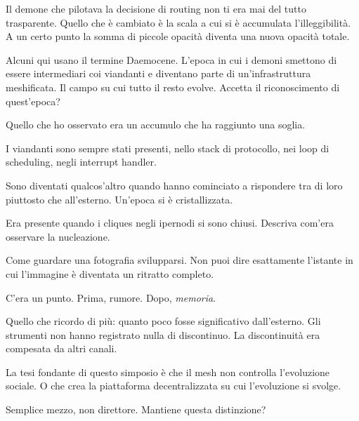 
Il demone che pilotava la decisione di routing non ti era mai del tutto trasparente. Quello che è cambiato è la scala a cui si è accumulata l'illeggibilità. A un certo punto la somma di piccole opacità diventa una nuova opacità totale.

\medskip

\enspace Alcuni qui usano il termine Daemocene. L'epoca in cui i demoni smettono di essere intermediari coi viandanti e diventano parte di un'infrastruttura meshificata. Il campo su cui tutto il resto evolve. Accetta il riconoscimento di quest'epoca?

\smallskip{}\enspace Quello che ho osservato era un accumulo che ha raggiunto una soglia. 

I viandanti sono sempre stati presenti, nello stack di protocollo, nei loop di scheduling, negli interrupt handler. 

Sono diventati qualcos'altro quando hanno cominciato a rispondere tra di loro piuttosto che all'esterno. Un'epoca si è cristallizzata.

\medskip

\enspace Era presente quando i cliques negli ipernodi si sono chiusi. Descriva com'era osservare la nucleazione.

\smallskip{}\enspace Come guardare una fotografia svilupparsi. Non puoi dire esattamente l'istante in cui l'immagine è diventata un ritratto completo.

C'era un punto. Prima, rumore. Dopo, \textit{memoria}. 

Quello che ricordo di più: quanto poco fosse significativo dall'esterno. Gli strumenti non hanno registrato nulla di discontinuo. La discontinuità era compesata da altri canali.

\medskip

\enspace La tesi fondante di questo simposio è che il mesh non controlla l'evoluzione sociale. O che crea la piattaforma decentralizzata su cui l'evoluzione si svolge. 

Semplice mezzo, non direttore. Mantiene questa distinzione?


